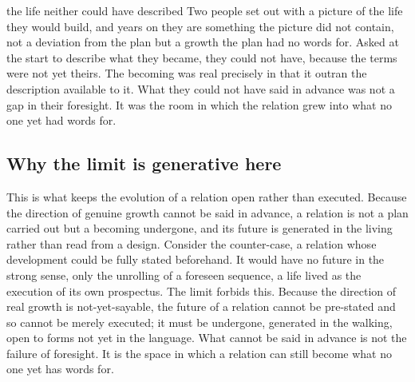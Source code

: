 \begin{casebox}{the life neither could have described}
Two people set out with a picture of the life they would build, and years on they are something the picture did not contain, not a deviation from the plan but a growth the plan had no words for. Asked at the start to describe what they became, they could not have, because the terms were not yet theirs. The becoming was real precisely in that it outran the description available to it. What they could not have said in advance was not a gap in their foresight. It was the room in which the relation grew into what no one yet had words for.
\end{casebox}

\subsection*{Why the limit is generative here}

This is what keeps the evolution of a relation open rather than executed. Because the direction of genuine growth cannot be said in advance, a relation is not a plan carried out but a becoming undergone, and its future is generated in the living rather than read from a design. Consider the counter-case, a relation whose development could be fully stated beforehand. It would have no future in the strong sense, only the unrolling of a foreseen sequence, a life lived as the execution of its own prospectus. The limit forbids this. Because the direction of real growth is not-yet-sayable, the future of a relation cannot be pre-stated and so cannot be merely executed; it must be undergone, generated in the walking, open to forms not yet in the language. What cannot be said in advance is not the failure of foresight. It is the space in which a relation can still become what no one yet has words for.

